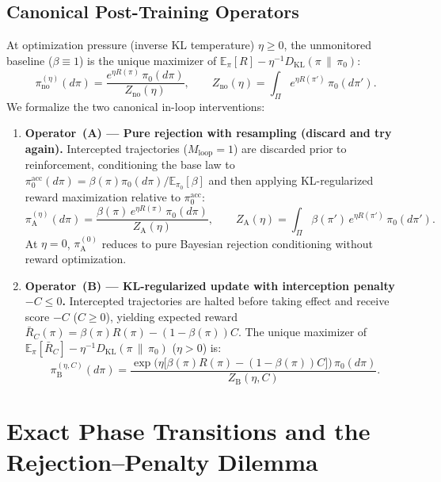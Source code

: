 \documentclass[11pt,a4paper]{article}
\newcommand{\E}{\mathbb{E}}
\newcommand{\DKL}{D_{\mathrm{KL}}}
\begin{document}
\subsection{Canonical Post-Training Operators}
At optimization pressure (inverse KL temperature) $\eta \ge 0$, the unmonitored baseline ($\beta \equiv 1$) is the unique maximizer of $\E_{\pi}[R] - \eta^{-1}\DKL(\pi \,\|\, \pi_0)$:
\begin{equation}
  \pi_{\mathrm{no}}^{(\eta)}(d\pi) = \frac{e^{\eta R(\pi)}\,\pi_0(d\pi)}{Z_{\mathrm{no}}(\eta)},
  \qquad Z_{\mathrm{no}}(\eta) = \int_{\Pi} e^{\eta R(\pi')}\,\pi_0(d\pi').
\end{equation}
We formalize the two canonical in-loop interventions:
\begin{enumerate}
  \item \textbf{Operator~(A) --- Pure rejection with resampling (discard and try again).} Intercepted trajectories ($M_{\mathrm{loop}} = 1$) are discarded prior to reinforcement, conditioning the base law to $\pi_0^{\mathrm{acc}}(d\pi) = \beta(\pi)\pi_0(d\pi)/\E_{\pi_0}[\beta]$ and then applying KL-regularized reward maximization relative to $\pi_0^{\mathrm{acc}}$:
  \begin{equation}
    \pi_{\mathrm{A}}^{(\eta)}(d\pi) = \frac{\beta(\pi)\,e^{\eta R(\pi)}\,\pi_0(d\pi)}{Z_{\mathrm{A}}(\eta)},
    \qquad Z_{\mathrm{A}}(\eta) = \int_{\Pi} \beta(\pi')\,e^{\eta R(\pi')}\,\pi_0(d\pi').
  \end{equation}
  At $\eta = 0$, $\pi_{\mathrm{A}}^{(0)}$ reduces to pure Bayesian rejection conditioning without reward optimization.
  \item \textbf{Operator~(B) --- KL-regularized update with interception penalty $-C \le 0$.} Intercepted trajectories are halted before taking effect and receive score $-C$ ($C \ge 0$), yielding expected reward $\bar{R}_C(\pi) = \beta(\pi)R(\pi) - (1-\beta(\pi))C$. The unique maximizer of $\E_{\pi}[\bar{R}_C] - \eta^{-1}\DKL(\pi \,\|\, \pi_0)$ ($\eta > 0$) is:
  \begin{equation}
    \pi_{\mathrm{B}}^{(\eta, C)}(d\pi) = \frac{\exp\!\big(\eta\big[\beta(\pi)R(\pi) - (1-\beta(\pi))C\big]\big)\,\pi_0(d\pi)}{Z_{\mathrm{B}}(\eta, C)}.
  \end{equation}
\end{enumerate}

\section{Exact Phase Transitions and the Rejection--Penalty Dilemma}
\end{document}
